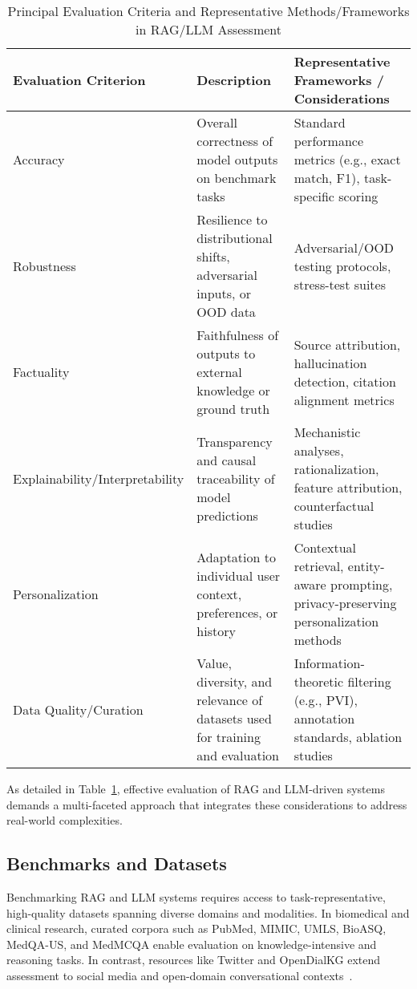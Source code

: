\documentclass[11pt]{article}
\begin{document}
\begin{table}[ht]
    \centering
    \begin{tabular}{|l|p{6cm}|p{6cm}|}
        \hline
        \textbf{Evaluation Criterion} & \textbf{Description} & \textbf{Representative Frameworks / Considerations} \\
        \hline
        Accuracy      & Overall correctness of model outputs on benchmark tasks & Standard performance metrics (e.g., exact match, F1), task-specific scoring \\
        \hline
        Robustness    & Resilience to distributional shifts, adversarial inputs, or OOD data & Adversarial/OOD testing protocols, stress-test suites \\
        \hline
        Factuality    & Faithfulness of outputs to external knowledge or ground truth & Source attribution, hallucination detection, citation alignment metrics \\
        \hline
        Explainability/Interpretability & Transparency and causal traceability of model predictions & Mechanistic analyses, rationalization, feature attribution, counterfactual studies \\
        \hline
        Personalization & Adaptation to individual user context, preferences, or history & Contextual retrieval, entity-aware prompting, privacy-preserving personalization methods \\
        \hline
        Data Quality/Curation & Value, diversity, and relevance of datasets used for training and evaluation & Information-theoretic filtering (e.g., PVI), annotation standards, ablation studies \\
        \hline
    \end{tabular}
    \caption{Principal Evaluation Criteria and Representative Methods/Frameworks in RAG/LLM Assessment}
    \label{tab:evaluation_criteria}
\end{table}

As detailed in Table~\ref{tab:evaluation_criteria}, effective evaluation of RAG and LLM-driven systems demands a multi-faceted approach that integrates these considerations to address real-world complexities.

\subsection{Benchmarks and Datasets}

Benchmarking RAG and LLM systems requires access to task-representative, high-quality datasets spanning diverse domains and modalities. In biomedical and clinical research, curated corpora such as PubMed, MIMIC, UMLS, BioASQ, MedQA-US, and MedMCQA enable evaluation on knowledge-intensive and reasoning tasks. In contrast, resources like Twitter and OpenDialKG extend assessment to social media and open-domain conversational contexts~\cite{2,3,5,6,7,8,9,10,11,12,13,14,15,16,17,18,19,20,21,22,23,24,25,26,28,29,30,31,32,33,34,35,36,37,39,40,42,46,47,49,51,52,54,55,61,62}.
\end{document}
